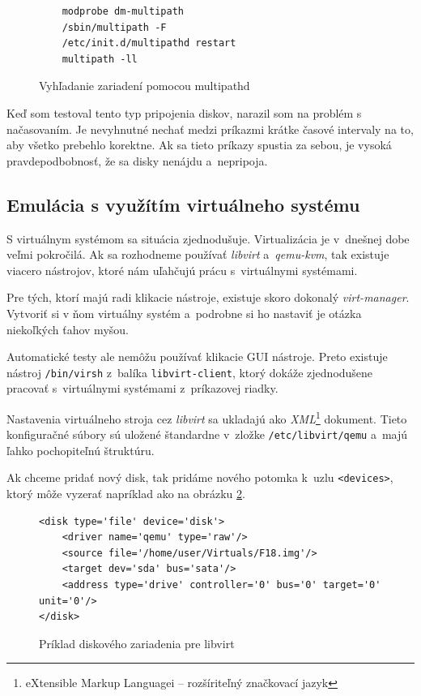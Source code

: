 \begin{figure}[H]
\begin{lstlisting}
    modprobe dm-multipath
    /sbin/multipath -F
    /etc/init.d/multipathd restart
    multipath -ll
\end{lstlisting}
\caption{Vyhľadanie zariadení pomocou multipathd}
\label{alg:multipathd}
\end{figure}

Keď som testoval tento typ pripojenia diskov, narazil som na problém s
načasovaním. Je nevyhnutné nechať medzi príkazmi krátke časové intervaly na to,
aby všetko prebehlo korektne. Ak sa tieto príkazy spustia za sebou, je vysoká
pravdepodbobnosť, že sa disky nenájdu a~nepripoja.

%
%

\subsection{Emulácia s využítím virtuálneho systému}

S virtuálnym systémom sa situácia zjednodušuje. Virtualizácia je v~dnešnej dobe
veľmi pokročilá. Ak sa rozhodneme používať \emph{libvirt} a~\emph{qemu-kvm},
tak existuje viacero nástrojov, ktoré nám uľahčujú prácu s~virtuálnymi
systémami.

Pre tých, ktorí majú radi klikacie nástroje, existuje skoro dokonalý
\emph{virt-manager}. Vytvoriť si v ňom virtuálny systém a~podrobne si ho
nastaviť je otázka niekoľkých ťahov myšou. 

Automatické testy ale nemôžu používať klikacie GUI nástroje. Preto existuje
nástroj \texttt{/bin/virsh} z~balíka \texttt{libvirt-client}, ktorý dokáže
zjednodušene pracovať s~virtuálnymi systémami z~príkazovej riadky.  

Nastavenia virtuálneho stroja cez \emph{libvirt} sa ukladajú ako
\emph{XML}\footnote{eXtensible Markup Languagei -- rozšíriteľný značkovací
jazyk} dokument. Tieto konfiguračné súbory sú uložené štandardne v~zložke
\texttt{/etc/libvirt/qemu} a~majú ľahko pochopiteľnú štruktúru.

Ak chceme pridať nový disk, tak pridáme nového potomka k~uzlu
\texttt{<devices>}, ktorý môže vyzerať napríklad ako na obrázku
\ref{alg:libvirt-xml-disk}.

\begin{figure}[H]
\begin{lstlisting}
<disk type='file' device='disk'>
    <driver name='qemu' type='raw'/>
    <source file='/home/user/Virtuals/F18.img'/>
    <target dev='sda' bus='sata'/>
    <address type='drive' controller='0' bus='0' target='0' unit='0'/>
</disk>
\end{lstlisting}
\caption{Príklad diskového zariadenia pre libvirt}
\label{alg:libvirt-xml-disk}
\end{figure}

